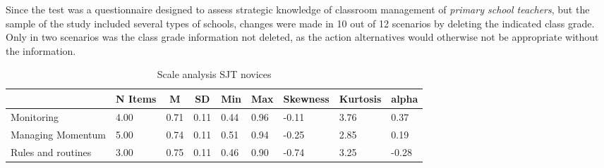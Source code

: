 \documentclass[
  man]{apa6}
\begin{document}
Since the test was a questionnaire designed to assess strategic knowledge of classroom management of \emph{primary school teachers}, but the sample of the study included several types of schools, changes were made in 10 out of 12 scenarios by deleting the indicated class grade. Only in two scenarios was the class grade information not deleted, as the action alternatives would otherwise not be appropriate without the information.

\begin{table}[h]

\begin{center}
\begin{threeparttable}

\caption{\label{tab:sjt}Scale analysis SJT novices}

\tiny{

\begin{tabular}{lllllllll}
\toprule
 & \multicolumn{1}{c}{N Items} & \multicolumn{1}{c}{M} & \multicolumn{1}{c}{SD} & \multicolumn{1}{c}{Min} & \multicolumn{1}{c}{Max} & \multicolumn{1}{c}{Skewness} & \multicolumn{1}{c}{Kurtosis} & \multicolumn{1}{c}{alpha}\\
\midrule
Monitoring & 4.00 & 0.71 & 0.11 & 0.44 & 0.96 & -0.11 & 3.76 & 0.37\\
Managing Momentum & 5.00 & 0.74 & 0.11 & 0.51 & 0.94 & -0.25 & 2.85 & 0.19\\
Rules and routines & 3.00 & 0.75 & 0.11 & 0.46 & 0.90 & -0.74 & 3.25 & -0.28\\
\bottomrule
\end{tabular}

}

\end{threeparttable}
\end{center}

\end{table}
\end{document}
